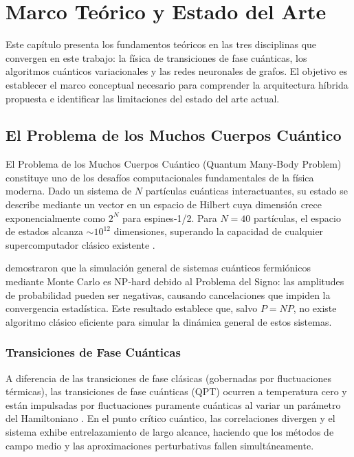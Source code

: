 \documentclass[11pt,a4paper,spanish]{book}
\begin{document}
\chapter{Marco Teórico y Estado del Arte}

Este capítulo presenta los fundamentos teóricos en las tres disciplinas que convergen en este trabajo: la física de transiciones de fase cuánticas, los algoritmos cuánticos variacionales y las redes neuronales de grafos. El objetivo es establecer el marco conceptual necesario para comprender la arquitectura híbrida propuesta e identificar las limitaciones del estado del arte actual.

\section{El Problema de los Muchos Cuerpos Cuántico}

El Problema de los Muchos Cuerpos Cuántico (Quantum Many-Body Problem) constituye uno de los desafíos computacionales fundamentales de la física moderna. Dado un sistema de $N$ partículas cuánticas interactuantes, su estado se describe mediante un vector en un espacio de Hilbert cuya dimensión crece exponencialmente como $2^N$ para espines-1/2. Para $N = 40$ partículas, el espacio de estados alcanza $\sim 10^{12}$ dimensiones, superando la capacidad de cualquier supercomputador clásico existente \citep{feynman1982}.

\citet{troyer2005} demostraron que la simulación general de sistemas cuánticos fermiónicos mediante Monte Carlo es NP-hard debido al Problema del Signo: las amplitudes de probabilidad pueden ser negativas, causando cancelaciones que impiden la convergencia estadística. Este resultado establece que, salvo $P = NP$, no existe algoritmo clásico eficiente para simular la dinámica general de estos sistemas.

\subsection{Transiciones de Fase Cuánticas}

A diferencia de las transiciones de fase clásicas (gobernadas por fluctuaciones térmicas), las transiciones de fase cuánticas (QPT) ocurren a temperatura cero y están impulsadas por fluctuaciones puramente cuánticas al variar un parámetro del Hamiltoniano \citep{dutta2015, sachdev2011}. En el punto crítico cuántico, las correlaciones divergen y el sistema exhibe entrelazamiento de largo alcance, haciendo que los métodos de campo medio y las aproximaciones perturbativas fallen simultáneamente.
\end{document}
